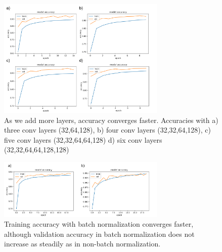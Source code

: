 \documentclass[12pt]{article}
\begin{document}
\begin{figure}[!tpb]
	\centerline{\includegraphics[width=80mm]{comparinglayerdepth.png}}
	\caption{\label{Figure 6}
		As we add more layers, accuracy converges faster. Accuracies with a) three conv layers (32,64,128), b) four conv layers (32,32,64,128), c) five conv layers (32,32,64,64,128) d) six conv layers (32,32,64,64,128,128)}
\end{figure}

\begin{figure}[!tpb]
	\centerline{\includegraphics[width=80mm]{comparingbatchnorm.png}}
	\caption{\label{Figure 7}
		 Training accuracy with batch normalization converges faster, although validation accuracy in batch normalization does not increase as steadily as in non-batch normalization.}
\end{figure}
\end{document}
